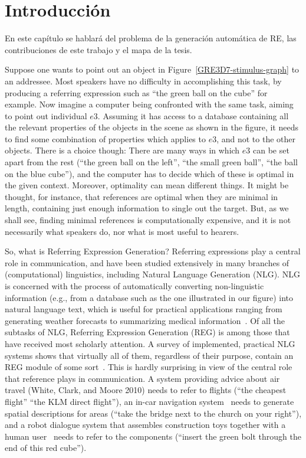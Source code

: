 \chapter{Introducci\'on}
En este cap\'itulo se hablar\'a del problema de la generaci\'on autom\'atica de RE, las contribuciones de este trabajo y el mapa de la tesis.

Suppose one wants to point out an object in Figure~\ref{GRE3D7-stimulus-graph} to an addressee. Most speakers
have no difficulty in accomplishing this task, by producing a referring expression
such as ``the green ball on the cube'' for example. Now imagine a computer being confronted
with the same task, aiming to point out individual $e3$. Assuming it has access to a
database containing all the relevant properties of the objects in the scene as shown in the figure, it needs to
find some combination of properties which applies to $e3$, and not to the other objects.
There is a choice though: There are many ways in which $e3$ can be set apart from the
rest (``the green ball on the left'', ``the small green ball'', ``the ball on the blue cube''), and
the computer has to decide which of these is optimal in the given context. Moreover,
optimality can mean different things. It might be thought, for instance, that references
are optimal when they are minimal in length, containing just enough information to
single out the target. But, as we shall see, finding minimal references is computationally
expensive, and it is not necessarily what speakers do, nor what is most useful to hearers.

So, what is Referring Expression Generation? Referring expressions play a central role
in communication, and have been studied extensively in many branches of (computational) linguistics,
 including Natural Language Generation (NLG). NLG is concerned with the process of automatically converting non-linguistic information (e.g.,
from a database such as the one illustrated in our figure) into natural language text, which is useful for practical applications
ranging from generating weather forecasts to summarizing medical information~\cite{dale2000}. Of all the subtasks of NLG, Referring Expression Generation (REG) is
among those that have received most scholarly attention. A survey of implemented,
practical NLG systems shows that virtually all of them, regardless of their purpose,
contain an REG module of some sort~\cite{Mellish2004}. This is hardly surprising
in view of the central role that reference plays in communication. A system providing
advice about air travel (White, Clark, and Moore 2010) needs to refer to flights (``the
cheapest flight'' ``the KLM direct flight''), an in-car navigation system~\cite{Drager:2012:GLN:2380816.2380908}
needs to generate spatial descriptions for areas (``take the bridge next to the church on your right''), 
and a robot dialogue system that assembles construction
toys together with a human user~\cite{foster-etal-ijcai2009} needs to refer to the components
(``insert the green bolt through the end of this red cube'').


